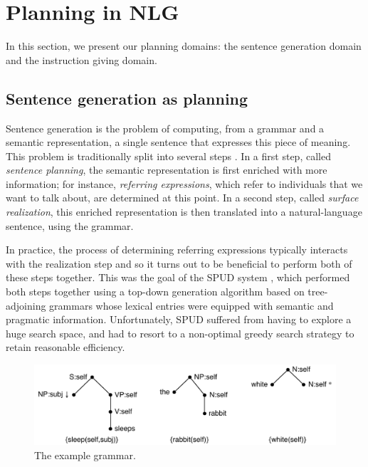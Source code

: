 \section{Planning in NLG} \label{sec:domains}

In this section, we present our planning domains: the sentence
generation domain and the instruction giving domain.


\subsection{Sentence generation as planning}

Sentence generation is the problem of computing, from a grammar and a
semantic representation, a single sentence that expresses this piece of
meaning.  This problem is traditionally split into several steps
\cite{reiter00building}.  In a first step, called \emph{sentence planning},
the semantic representation is first enriched with more information; for
instance, \emph{referring expressions}, which refer to individuals
that we want to talk about, are determined at this point. In a second
step, called \emph{surface realization}, this enriched representation is
then translated into a natural-language sentence, using the grammar.

In practice, the process of determining referring expressions typically
interacts with the realization step and so it turns out to be beneficial to
perform both of these steps together. This was the goal of the SPUD system
\cite{Stone2003a}, which performed both steps together using a top-down
generation algorithm based on tree-adjoining grammars \cite{joshi;etal1997}
whose lexical entries were equipped with semantic and pragmatic
information. Unfortunately, SPUD suffered from having to explore a huge
search space, and had to resort to a non-optimal greedy search strategy to
retain reasonable efficiency. 


\begin{figure}
  \centering
  \includegraphics[width=\columnwidth]{pic-grammar}
  \caption{The example grammar.}
  \label{fig:white-rabbit-sleeps-grammar}
\end{figure}

